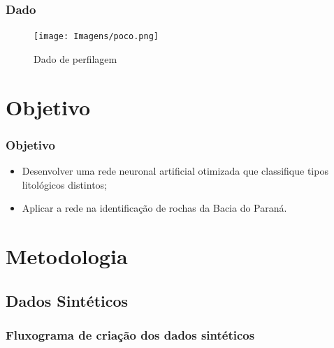 \documentclass[10pt]{beamer} %
\begin{document}
\begin{frame}
	\frametitle{Dado}
	\begin{figure}[H]
		\centering
		\texttt{[image: Imagens/poco.png]}
		\caption{Dado de perfilagem }
	\end{figure}
\end{frame}

\section{Objetivo}

\begin{frame}
	\frametitle{Objetivo}
	\begin{itemize}
		\item Desenvolver uma rede neuronal artificial otimizada que classifique tipos litológicos distintos;
		\pause
		\item  Aplicar a rede na identificação de rochas da Bacia do Paraná. 
	\end{itemize}
\end{frame}


\section{Metodologia}

\subsection{Dados Sintéticos}
\begin{frame}
	\frametitle{Fluxograma de criação dos dados sintéticos}
\begin{footnotesize}
	\begin{figure}[H]
		\centering

	\end{figure}
	
\end{footnotesize}	
\end{frame}
\end{document}
